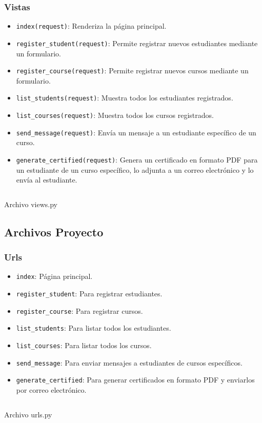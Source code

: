 \documentclass{article}
\newenvironment{block}{\captionsetup{type=listing}}{}
\begin{document}
\subsubsection{Vistas}
\begin{itemize}
	\item \texttt{index(request)}: Renderiza la página principal.
	\item \texttt{register\_student(request)}: Permite registrar nuevos estudiantes mediante un formulario.
	\item \texttt{register\_course(request)}: Permite registrar nuevos cursos mediante un formulario.
	\item \texttt{list\_students(request)}: Muestra todos los estudiantes registrados.
	\item \texttt{list\_courses(request)}: Muestra todos los cursos registrados.
	\item \texttt{send\_message(request)}: Envía un mensaje a un estudiante específico de un curso.
	\item \texttt{generate\_certified(request)}: Genera un certificado en formato PDF para un estudiante de un curso específico, lo adjunta a un correo electrónico y lo envía al estudiante.
\end{itemize}
\begin{block}
	\inputminted{python}{../Course_Management_System/systemM/views.py}
	\caption{Archivo views.py}
\end{block}

\subsection{Archivos Proyecto}
\subsubsection{Urls}
\begin{itemize}
	\item \texttt{index}: Página principal.
	\item \texttt{register\_student}: Para registrar estudiantes.
	\item \texttt{register\_course}: Para registrar cursos.
	\item \texttt{list\_students}: Para listar todos los estudiantes.
	\item \texttt{list\_courses}: Para listar todos los cursos.
	\item \texttt{send\_message}: Para enviar mensajes a estudiantes de cursos específicos.
	\item \texttt{generate\_certified}: Para generar certificados en formato PDF y enviarlos por correo electrónico.
\end{itemize}
\begin{block}
	\inputminted{python}{../Course_Management_System/systemM/urls.py}
	\caption{Archivo urls.py}
\end{block}
\end{document}
